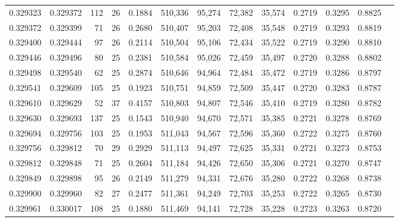 \begin{tabular}{rrrrrrrrrrrrr}
0.329323 & 0.329372 &   112 &  26 &                                     0.1884 & 510,336 &  95,274 &  72,382 &  35,574 & 0.2719 & 0.3295 & 0.8825 \\
0.329372 & 0.329399 &    71 &  26 &                                     0.2680 & 510,407 &  95,203 &  72,408 &  35,548 & 0.2719 & 0.3293 & 0.8819 \\
0.329400 & 0.329444 &    97 &  26 &                                     0.2114 & 510,504 &  95,106 &  72,434 &  35,522 & 0.2719 & 0.3290 & 0.8810 \\
0.329446 & 0.329496 &    80 &  25 &                                     0.2381 & 510,584 &  95,026 &  72,459 &  35,497 & 0.2720 & 0.3288 & 0.8802 \\
0.329498 & 0.329540 &    62 &  25 &                                     0.2874 & 510,646 &  94,964 &  72,484 &  35,472 & 0.2719 & 0.3286 & 0.8797 \\
0.329541 & 0.329609 &   105 &  25 &                                     0.1923 & 510,751 &  94,859 &  72,509 &  35,447 & 0.2720 & 0.3283 & 0.8787 \\
0.329610 & 0.329629 &    52 &  37 &                                     0.4157 & 510,803 &  94,807 &  72,546 &  35,410 & 0.2719 & 0.3280 & 0.8782 \\
0.329630 & 0.329693 &   137 &  25 &                                     0.1543 & 510,940 &  94,670 &  72,571 &  35,385 & 0.2721 & 0.3278 & 0.8769 \\
0.329694 & 0.329756 &   103 &  25 &                                     0.1953 & 511,043 &  94,567 &  72,596 &  35,360 & 0.2722 & 0.3275 & 0.8760 \\
0.329756 & 0.329812 &    70 &  29 &                                     0.2929 & 511,113 &  94,497 &  72,625 &  35,331 & 0.2721 & 0.3273 & 0.8753 \\
0.329812 & 0.329848 &    71 &  25 &                                     0.2604 & 511,184 &  94,426 &  72,650 &  35,306 & 0.2721 & 0.3270 & 0.8747 \\
0.329849 & 0.329898 &    95 &  26 &                                     0.2149 & 511,279 &  94,331 &  72,676 &  35,280 & 0.2722 & 0.3268 & 0.8738 \\
0.329900 & 0.329960 &    82 &  27 &                                     0.2477 & 511,361 &  94,249 &  72,703 &  35,253 & 0.2722 & 0.3265 & 0.8730 \\
0.329961 & 0.330017 &   108 &  25 &                                     0.1880 & 511,469 &  94,141 &  72,728 &  35,228 & 0.2723 & 0.3263 & 0.8720 \\

\end{tabular}
